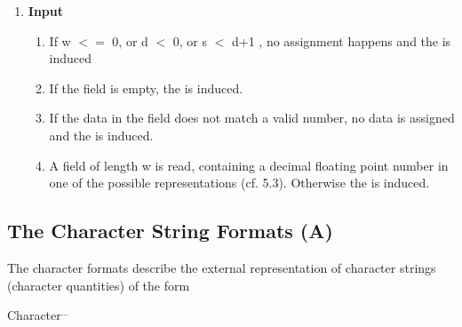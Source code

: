 \begin{enumerate}
\begin{enumerate}
\end{enumerate}
 
\item {\bf Input}\\
\begin{enumerate}
\item If w $<=$ 0, or d $<$ 0, or s $<$ 
d+1 , no assignment happens and  
         the  is induced
\item If the field  is empty, the  is induced.
\item If the data in the field does not match a valid number, 
 no data is assigned and the  is induced.
\item A field of length w is read,
    containing a decimal floating point number
    in one of the possible representations (cf. 5.3).
    Otherwise the  is induced.
\end{enumerate}
\end{enumerate}


\subsection{The Character String Formats (A)}  %
\label{sec_dation_a_format}

\begin{grammarframe}

\end{grammarframe}


The character formats describe the external representation of character
strings (character quantities) of the form

Character$^{...}$

